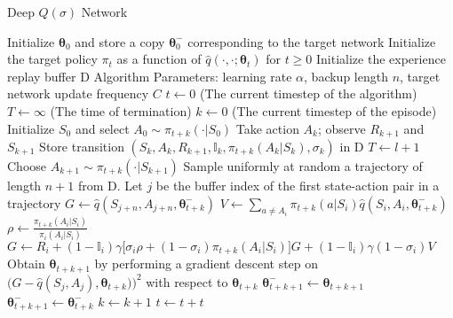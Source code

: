 \begin{algorithm}[H]
	\caption{Deep $Q(\sigma)$ Network}
	\label{alg:deep_qsigma_network}
	\begin{algorithmic}[1]
		\STATE Initialize $\boldsymbol\theta_0$ and store a copy $\boldsymbol\theta^-_0$ 
        		corresponding to the target network
        \STATE Initialize the target policy $\pi_t$ as a function of $\hat{q}(\cdot, \cdot ;\boldsymbol{\theta}_t)$
                for $t \geq 0$
        \STATE Initialize the experience replay buffer D
        \STATE Algorithm Parameters: learning rate $\alpha$, backup length $n$,
        		target network update frequency $C$
		\STATE $t \leftarrow 0$ (The current timestep of the algorithm)
        	\STATE $T \leftarrow \infty$ (The time of termination)
            \STATE $k \leftarrow 0$ (The current timestep of the episode)
            \STATE Initialize $S_0$ and select $A_0 \sim \pi_{t+k} (\cdot | S_0)$
            	\STATE Take action $A_k$; observe $R_{k+1}$ and $S_{k+1}$
                \STATE Store transition 
                		$(S_k, A_k, R_{k+1}, \mathbb{I}_k, \pi_{t+k}(A_k| S_k), \sigma_k)$ in D
                	\STATE $T \leftarrow l+1$
                \ELSE
                	\STATE Choose $A_{k+1} \sim \pi_{t+k}(\cdot|S_{k+1})$
                \ENDIF
                \STATE Sample uniformly at random a trajectory of length $n + 1$ from D. Let $j$ be the
                        buffer index of the first state-action pair in a trajectory
				\STATE $G \leftarrow \hat{q}(S_{j+n}, A_{j+n}, \boldsymbol\theta^-_{t+k})$
                  	\STATE $V \leftarrow \sum_{a \neq A_i} \pi_{t+k}(a|S_i)
                      		\hat{q}(S_i, A_i, \boldsymbol\theta^-_{t+k})$
					\STATE $\rho \leftarrow \frac{\pi_{t+k}(A_i |S_i)}{\pi_i(A_i|S_i)}$
                    \STATE $G \leftarrow R_i + (1- \mathbb{I}_i) \gamma \big[
                       		\sigma_i \rho + (1-\sigma_i) \pi_{t+k}(A_i|S_i) \big] G
                            + (1-\mathbb{I}_i) \gamma (1-\sigma_i) V$
                \ENDFOR
				\STATE Obtain $\boldsymbol\theta_{t+k+1}$ by performing a gradient descent step on
                   		\newline $\big(G - \hat{q}(S_j, A_j), \boldsymbol\theta_{t+k})\big)^2$ 
                   		with respect to $\boldsymbol\theta_{t+k}$
                	\STATE $\boldsymbol\theta^-_{t+k+1} \leftarrow \boldsymbol\theta_{t+k+1}$
                \ELSE
                	\STATE $\boldsymbol\theta^-_{t+k+1} \leftarrow \boldsymbol\theta^-_{t+k}$
                \ENDIF
            	\STATE $k \leftarrow k+1$
            \ENDWHILE
            \STATE $t \leftarrow t + t$
        \ENDFOR
	\end{algorithmic}
\end{algorithm}

